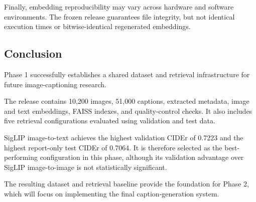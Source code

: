\documentclass{article}
\begin{document}
Finally, embedding reproducibility may vary across hardware and
software environments. The frozen release guarantees file integrity,
but not identical execution times or bitwise-identical regenerated
embeddings.

\newpage
\subsection{Conclusion}\label{conclusion}

Phase 1 successfully establishes a shared dataset and retrieval
infrastructure for future image-captioning research.

The release contains 10,200 images, 51,000 captions, extracted
metadata, image and text embeddings, FAISS indexes, and quality-control
checks. It also includes five retrieval configurations evaluated
using validation and test data.

SigLIP image-to-text achieves the highest validation CIDEr of
0.7223 and the highest report-only test CIDEr of 0.7064. It is
therefore selected as the best-performing configuration in this
phase, although its validation advantage over SigLIP image-to-image
is not statistically significant.

The resulting dataset and retrieval baseline provide the foundation
for Phase 2, which will focus on implementing the final
caption-generation system.

\newpage


\end{document}
